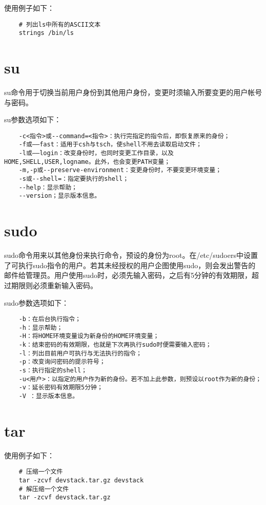 \documentclass[a4paper,left=2.5cm,right=2.5cm,11pt]{article}
\begin{document}
	使用例子如下：
	\begin{lstlisting}
	# 列出ls中所有的ASCII文本
	strings /bin/ls
	\end{lstlisting}

\section{su}
	su命令用于切换当前用户身份到其他用户身份，变更时须输入所要变更的用户帐号与密码。\par

	su参数选项如下：
	\begin{lstlisting}
	-c<指令>或--command=<指令>：执行完指定的指令后，即恢复原来的身份； 
	-f或——fast：适用于csh与tsch，使shell不用去读取启动文件； 
	-l或——login：改变身份时，也同时变更工作目录，以及HOME,SHELL,USER,logname。此外，也会变更PATH变量； 
	-m,-p或--preserve-environment：变更身份时，不要变更环境变量； 
	-s或--shell=：指定要执行的shell； 
	--help：显示帮助； 
	--version；显示版本信息。
	\end{lstlisting}

\section{sudo}
	sudo命令用来以其他身份来执行命令，预设的身份为root。在/etc/sudoers中设置了可执行sudo指令的用户。若其未经授权的用户企图使用sudo，则会发出警告的邮件给管理员。用户使用sudo时，必须先输入密码，之后有5分钟的有效期限，超过期限则必须重新输入密码。\par

	sudo参数选项如下：
	\begin{lstlisting}
	-b：在后台执行指令； 
	-h：显示帮助； 
	-H：将HOME环境变量设为新身份的HOME环境变量； 
	-k：结束密码的有效期限，也就是下次再执行sudo时便需要输入密码；
	-l：列出目前用户可执行与无法执行的指令； 
	-p：改变询问密码的提示符号； 
	-s：执行指定的shell； 
	-u<用户>：以指定的用户作为新的身份。若不加上此参数，则预设以root作为新的身份； 
	-v：延长密码有效期限5分钟； 
	-V ：显示版本信息。
	\end{lstlisting}

\section{tar}
	使用例子如下：
	\begin{lstlisting}
	# 压缩一个文件
	tar -zcvf devstack.tar.gz devstack
	# 解压缩一个文件
	tar -zcvf devstack.tar.gz
	\end{lstlisting}
\end{document}
